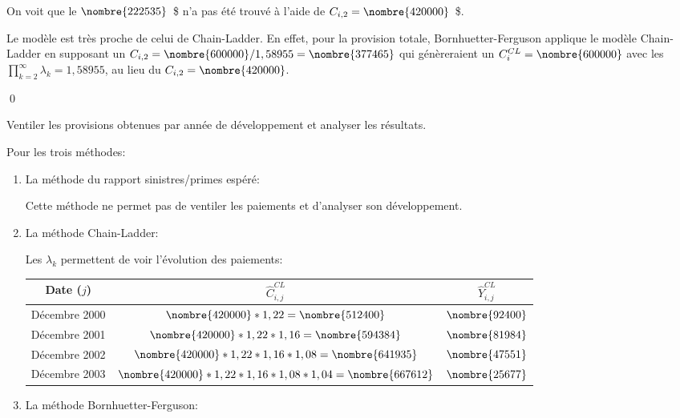 \begin{exemple}
\begin{enumerate}
    On voit que le $\nombre{222535}$~\$ n'a pas été trouvé à l'aide
    de $C_{i, 2} = \nombre{420000}$~\$.

    Le modèle est très proche de celui de Chain-Ladder. En effet, pour
    la provision totale, Bornhuetter-Ferguson applique le modèle
    Chain-Ladder en supposant un
    $C_{i,2} = \nombre{600000}/1,58955 = \nombre{377465}$ qui
    génèreraient un $C_i^{CL} = \nombre{600000}$ avec les
    $\prod_{k=2}^{\infty} \lambda_k = 1,58955$, au lieu du
    $C_{i, 2} = \nombre{420000}$.
  \end{enumerate}
  \qed
\end{exemple}

\begin{exemple}
  Ventiler les provisions obtenues par année de développement et
  analyser les résultats.

  Pour les trois méthodes:
  \begin{enumerate}
  \item La méthode du rapport sinistres/primes espéré:

    Cette méthode ne permet pas de ventiler les paiements et
    d'analyser son développement.

  \item La méthode Chain-Ladder:

    Les $\lambda_k$ permettent de voir l'évolution des paiements:
    \begin{center}
      \begin{tabular}{|c|c|c|}\hline
        Date ($j$) & $\hat{C}_{i,j}^{CL}$ & $\hat{Y}_{i,j}^{CL}$   \\ \hline
        Décembre 2000 &  $\nombre{420000}*1,22  = \nombre{512400}$ & $\nombre{92400}$ \\ \hline
        Décembre 2001 &  $\nombre{420000}*1,22*1,16 = \nombre{594384}$ & $\nombre{81984}$ \\ \hline
        Décembre 2002 &  $\nombre{420000}*1,22*1,16*1,08  =
                        \nombre{641935}$ & $\nombre{47551}$\\ \hline
        Décembre 2003 &  $\nombre{420000}*1,22*1,16*1,08*1,04 = \nombre{667612}$ & $\nombre{25677}$\\ \hline
      \end{tabular}
    \end{center}

  \item La méthode Bornhuetter-Ferguson:


\end{enumerate}
\end{exemple}
